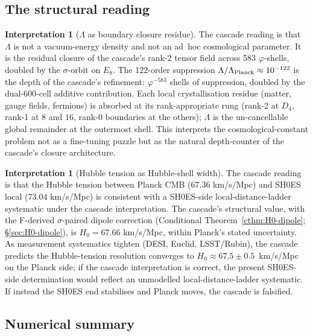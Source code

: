 \documentclass[11pt]{article}
\theoremstyle{plain}
\theoremstyle{definition}
\newtheorem{interpretation}[theorem]{Interpretation}
\theoremstyle{remark}
\begin{document}
\subsection{The structural reading}

\begin{interpretation}[$\Lambda$ as boundary closure residue]\label{int:lambda-residue}
The cascade reading is that $\Lambda$ is not a vacuum-energy density and not an ad~hoc cosmological parameter. It is the residual closure of the cascade's rank-$2$ tensor field across 583 $\varphi$-shells, doubled by the $\sigma$-orbit on $E_8$. The 122-order suppression $\Lambda / \Lambda_{\rm Planck} \approx 10^{-122}$ is the depth of the cascade's refinement: $\varphi^{-583}$ shells of suppression, doubled by the dual-600-cell additive contribution. Each local crystallisation residue (matter, gauge fields, fermions) is absorbed at its rank-appropriate rung (rank-2 at $D_4$, rank-1 at $8$ and $16$, rank-0 boundaries at the others); $\Lambda$ is the un-cancellable global remainder at the outermost shell. This interprets the cosmological-constant problem not as a fine-tuning puzzle but as the natural depth-counter of the cascade's closure architecture.
\end{interpretation}

\begin{interpretation}[Hubble tension as Hubble-shell width]\label{int:hubble-tension}
The cascade reading is that the Hubble tension between Planck CMB ($67.36$ km/s/Mpc) and SH0ES local ($73.04$ km/s/Mpc) is consistent with a SH0ES-side local-distance-ladder systematic under the cascade interpretation. The cascade's structural value, with the F-derived $\sigma$-paired dipole correction (Conditional Theorem~\ref{cthm:H0-dipole}; \S\ref{sec:H0-dipole}), is $H_0 = 67.66$ km/s/Mpc, within Planck's stated uncertainty. As measurement systematics tighten (DESI, Euclid, LSST/Rubin), the cascade predicts the Hubble-tension resolution converges to $H_0 \approx 67.5 \pm 0.5$~km/s/Mpc on the Planck side; if the cascade interpretation is correct, the present SH0ES-side determination would reflect an unmodelled local-distance-ladder systematic. If instead the SH0ES end stabilises and Planck moves, the cascade is falsified.
\end{interpretation}

\subsection{Numerical summary}\label{sec:lambda-summary}
\end{document}
